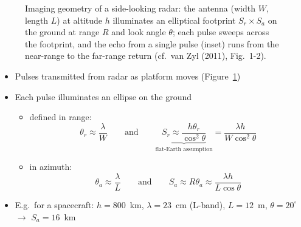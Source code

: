 \documentclass[11pt, oneside]{article}
\begin{document}
\begin{figure}[!htbp]
	\caption{Imaging geometry of a side-looking radar: the antenna (width $W$, length $L$) at altitude $h$ illuminates an elliptical footprint $S_r \times S_a$ on the ground at range $R$ and look angle $\theta$; each pulse sweeps across the footprint, and the echo from a single pulse (inset) runs from the near-range to the far-range return (cf.\ van Zyl (2011), Fig.~1-2).}
	\label{f:geom}
\end{figure}

\begin{itemize}
	\item Pulses transmitted from radar as platform moves (Figure~\ref{f:geom})
	\item Each pulse illuminates an ellipse on the ground
	\begin{itemize}
		\item[--] defined in range:
		\begin{equation}
			\label{e:Sr}
			\theta_r \approx \frac{\lambda}{W} \qquad \text{and} \qquad \underbrace{S_r \approx \frac{h\theta_r}{\cos^2\theta}}_{\text{flat-Earth assumption}} = \frac{\lambda h}{W\cos^2\theta}
		\end{equation}
		\item[--] in azimuth:
		\begin{equation}
			\label{e:Sa}
			\theta_a \approx \frac{\lambda}{L} \qquad \text{and} \qquad S_a \approx R\theta_a \approx \frac{\lambda h}{L\cos\theta}
		\end{equation}
	\end{itemize}
	\item[] E.g.\ for a spacecraft: $h = 800$~km, $\lambda = 23$~cm (L-band), $L = 12$~m, $\theta = 20^\circ$ $\rightarrow$ $S_a = 16$~km
\end{itemize}
\end{document}
